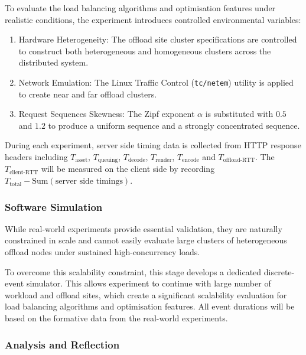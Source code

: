 \documentclass[11pt,a4paper]{article}
\begin{document}
To evaluate the load balancing algorithms and optimisation features under realistic conditions,
the experiment introduces controlled environmental variables:
\begin{enumerate}
    \item Hardware Heterogeneity: The offload site cluster specifications are controlled to construct both heterogeneous and homogeneous clusters across the distributed system.
    \item Network Emulation: The Linux Traffic Control (\texttt{tc/netem}) utility is applied to create near and far offload clusters.
    \item Request Sequences Skewness: The Zipf exponent $\alpha$ is substituted with $0.5$ and $1.2$  to produce a uniform sequence and a strongly concentrated sequence.
\end{enumerate}
During each experiment, server side timing data is collected from HTTP response headers including
$T_\text{asset}$, $T_\text{queuing}$, $T_\text{decode}$, $T_\text{render}$, $T_\text{encode}$ and $T_\text{offload-RTT}$.
The $T_\text{client-RTT}$ will be measured on the client side by recording $T_\text{total} - \text{Sum}(\text{server side timings})$.

\subsubsection{Software Simulation}
\label{sec:Simulation}

While real-world experiments provide essential validation,
they are naturally constrained in scale and cannot easily evaluate large clusters of heterogeneous offload nodes under sustained high-concurrency loads.

To overcome this scalability constraint, this stage develops a dedicated discrete-event simulator.
This allows experiment to continue with large number of workload and offload sites, 
which create a significant scalability evaluation for load balancing algorithms and optimisation features.
All event durations will be based on the formative data from the real-world experiments.

\subsubsection{Analysis and Reflection}
\label{sec:Analysis}
\end{document}
